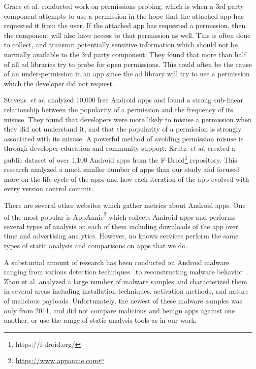 \documentclass{sig-alternate-05-2015}
\begin{document}


Grace et al.\cite{Grace:2012:UEA:2185448.2185464} conducted work on permissions probing, which is when a 3rd party component attempts to use a permission in the hope that the attached app has requested it from the user. If the attached app has requested a permission, then the component will also have access to that permission as well. This is often done to collect, and transmit potentially sensitive information which should not be normally available to the 3rd party component. They found that more than half of all ad libraries try to probe for open permissions. This could often be the cause of an under-permission in an app since the ad library will try to use a permission which the developer did not request.

Stevens~\emph{et al.}\cite{6624000} analyzed 10,000 free Android apps and found a strong sub-linear relationship between the popularity of a permission and the frequency of its misuse. They found that developers were more likely to misuse a permission when they did not understand it, and that the popularity of a permission is strongly associated with its misuse. A powerful method of avoiding permission misuse is through developer education and community support. Krutz~\emph{et al.}\cite{krutz2015FDroid} created a public dataset of over 1,100 Android apps from the F-Droid\footnote{https://f-droid.org/} repository. This research analyzed a much smaller number of apps than our study and focused more on the life cycle of the apps and how each iteration of the app evolved with every version control commit.

There are several other websites which gather metrics about Android apps. One of the most popular is AppAnnie\footnote{\url{https://www.appannie.com}} which collects Android apps and performs several types of analysis on each of them including downloads of the app over time and advertising analytics. However, no known services perform the same types of static analysis and comparisons on apps that we do.

A substantial amount of research has been conducted on Android malware ranging from various detection techniques~\cite{6799722, Feng:2014:ASD:2635868.2635869, Rastogi:2013:DEA:2484313.2484355} to reconstructing malware behavior~\cite{reina2013system}. Zhou et al.\cite{zhou2012dissecting} analyzed a large number of malware samples and characterized them in several areas including installation techniques, activation methods, and nature of malicious payloads. Unfortunately, the newest of these malware samples was only from 2011, and did not compare malicious and benign apps against one another, or use the range of static analysis tools as in our work.
\end{document}
